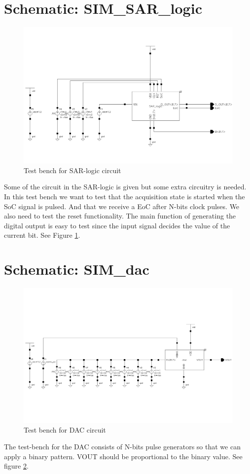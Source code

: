 \documentclass[english, a4paper,11pt]{article}
\begin{document}
\section*{Schematic: SIM\_SAR\_logic}
\begin{figure}[!ht]
 \centering
   \includegraphics[width=\textwidth]{img/SIM_SAR_logic.png}
   \caption{Test bench for SAR-logic circuit}
   \label{sim:logic}
\end{figure}
Some of the circuit in the SAR-logic is given but some extra circuitry is needed. In this test bench we want to test
that the acquisition state is started when the SoC signal is pulsed. And that we receive a EoC after N-bits clock pulses.
We also need to test the reset functionality. 
The main function of generating the digital output is easy to test since the input signal decides the value of the current bit.
See Figure \ref{sim:logic}.

\section*{Schematic: SIM\_dac}
\begin{figure}[!ht]
 \centering
   \includegraphics[width=\textwidth]{img/SIM_dac.png}
   \caption{Test bench for DAC circuit}
   \label{sim:dac}
\end{figure}
The test-bench for the DAC consists of N-bits pulse generators so that we can apply a binary pattern. 
VOUT should be proportional to the binary value.
See figure \ref{sim:dac}.
\end{document}
